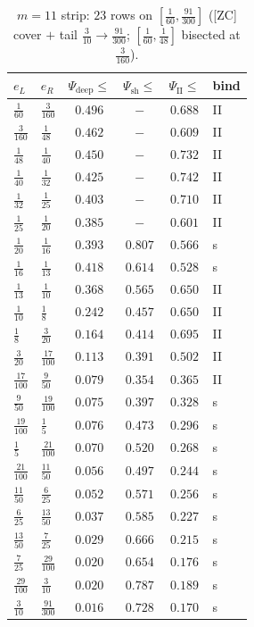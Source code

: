 \documentclass[11pt]{amsart}
\begin{document}
\begin{table}[p]\centering\small
\caption{$m=11$ strip: $23$ rows on $[\tfrac1{60},\tfrac{91}{300}]$ ([ZC] cover $+$ tail $\tfrac3{10}\!\to\!\tfrac{91}{300}$; $[\tfrac1{60},\tfrac1{48}]$ bisected at $\tfrac3{160}$).}\label{zc9:tab:m11}
\begin{tabular}{llcccl}\toprule
$e_L$&$e_R$&$\Psi_{\mathrm{deep}}\!\le$&$\Psi_{\mathrm{sh}}\!\le$&$\Psi_{\mathrm{II}}\!\le$&bind\\\midrule
$\tfrac{1}{60}$&$\tfrac{3}{160}$&$0.496$&$-$&$0.688$&II\\
$\tfrac{3}{160}$&$\tfrac{1}{48}$&$0.462$&$-$&$0.609$&II\\
$\tfrac{1}{48}$&$\tfrac{1}{40}$&$0.450$&$-$&$0.732$&II\\
$\tfrac{1}{40}$&$\tfrac{1}{32}$&$0.425$&$-$&$0.742$&II\\
$\tfrac{1}{32}$&$\tfrac{1}{25}$&$0.403$&$-$&$0.710$&II\\
$\tfrac{1}{25}$&$\tfrac{1}{20}$&$0.385$&$-$&$0.601$&II\\
$\tfrac{1}{20}$&$\tfrac{1}{16}$&$0.393$&$0.807$&$0.566$&s\\
$\tfrac{1}{16}$&$\tfrac{1}{13}$&$0.418$&$0.614$&$0.528$&s\\
$\tfrac{1}{13}$&$\tfrac{1}{10}$&$0.368$&$0.565$&$0.650$&II\\
$\tfrac{1}{10}$&$\tfrac{1}{8}$&$0.242$&$0.457$&$0.650$&II\\
$\tfrac{1}{8}$&$\tfrac{3}{20}$&$0.164$&$0.414$&$0.695$&II\\
$\tfrac{3}{20}$&$\tfrac{17}{100}$&$0.113$&$0.391$&$0.502$&II\\
$\tfrac{17}{100}$&$\tfrac{9}{50}$&$0.079$&$0.354$&$0.365$&II\\
$\tfrac{9}{50}$&$\tfrac{19}{100}$&$0.075$&$0.397$&$0.328$&s\\
$\tfrac{19}{100}$&$\tfrac{1}{5}$&$0.076$&$0.473$&$0.296$&s\\
$\tfrac{1}{5}$&$\tfrac{21}{100}$&$0.070$&$0.520$&$0.268$&s\\
$\tfrac{21}{100}$&$\tfrac{11}{50}$&$0.056$&$0.497$&$0.244$&s\\
$\tfrac{11}{50}$&$\tfrac{6}{25}$&$0.052$&$0.571$&$0.256$&s\\
$\tfrac{6}{25}$&$\tfrac{13}{50}$&$0.037$&$0.585$&$0.227$&s\\
$\tfrac{13}{50}$&$\tfrac{7}{25}$&$0.029$&$0.666$&$0.215$&s\\
$\tfrac{7}{25}$&$\tfrac{29}{100}$&$0.020$&$0.654$&$0.176$&s\\
$\tfrac{29}{100}$&$\tfrac{3}{10}$&$0.020$&$0.787$&$0.189$&s\\
$\tfrac{3}{10}$&$\tfrac{91}{300}$&$0.016$&$0.728$&$0.170$&s\\
\bottomrule\end{tabular}\end{table}
\end{document}
